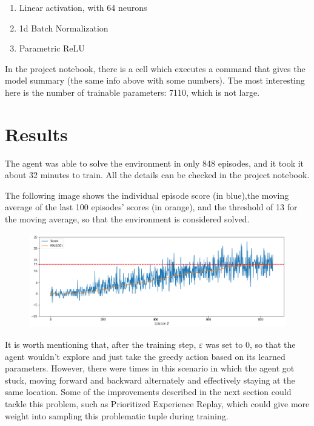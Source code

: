 \documentclass{article}
\begin{document}
\begin{enumerate}
    \item Linear activation, with 64 neurons
    \item 1d Batch Normalization
    \item Parametric ReLU \cite{he2015delving}
\end{enumerate}

In the project notebook, there is a cell which executes a command that gives the model summary (the same info above with some numbers). The most interesting here is the number of trainable parameters: 7110, which is not large.

\section{Results}

The agent was able to solve the environment in only 848 episodes, and it took it about 32 minutes to train. All the details can be checked in the project notebook.

The following image shows the individual episode score (in blue),the moving average of the last 100 episodes' scores (in orange), and the threshold of 13 for the moving average, so that the environment is considered solved.

\begin{figure}[H]
\centering
\centering
\includegraphics[scale=0.5]{img/score.png}
\label{fig:score}
\end{figure}

It is worth mentioning that, after the training step, $\varepsilon$ was set to 0, so that the agent wouldn't explore and just take the greedy action based on its learned parameters. However, there were times in this scenario in which the agent got stuck, moving forward and backward alternately and effectively staying at the same location. Some of the improvements described in the next section could tackle this problem, such as Prioritized Experience Replay, which could give more weight into sampling this problematic tuple during training.
\end{document}
